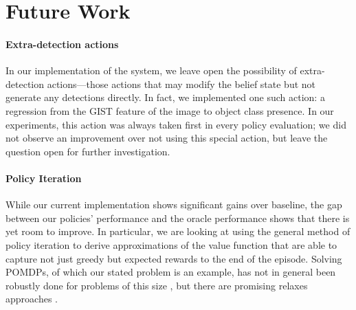 \section{Future Work}
\paragraph{Extra-detection actions}
In our implementation of the system, we leave open the possibility of extra-detection actions---those actions that may modify the belief state but not generate any detections directly.
In fact, we implemented one such action: a regression from the GIST \cite{Oliva2001a} feature of the image to object class presence.
In our experiments, this action was always taken first in every policy evaluation; we did not observe an improvement over not using this special action, but leave the question open for further investigation.

\paragraph{Policy Iteration}
While our current implementation shows significant gains over baseline, the gap between our policies' performance and the oracle performance shows that there is yet room to improve.
In particular, we are looking at using the general method of policy iteration to derive approximations of the value function that are able to capture not just greedy but expected rewards to the end of the episode.
Solving POMDPs, of which our stated problem is an example, has not in general been robustly done for problems of this size \cite{Murphy2000,Ng2000}, but there are promising relaxes approaches \cite{Kwok2004}.

